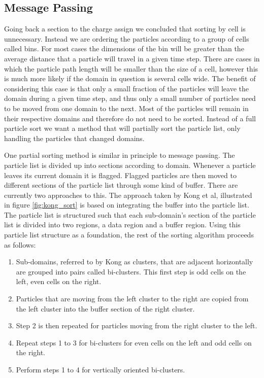 	\subsection{Message Passing}
	Going back a section to the charge assign we concluded that sorting by cell is unnecessary. Instead we are ordering the particles according to a group of cells called bins. For most cases the dimensions of the bin will be greater than the average distance that a particle will travel in a given time step. There are cases in which the particle path length will be smaller than the size of a cell, however this is much more likely if the domain in question is several cells wide. The benefit of considering this case is that only a small fraction of the particles will leave the domain during a given time step, and thus only a small number of particles need to be moved from one domain to the next. Most of the particles will remain in their respective domains and therefore do not need to be sorted. Instead of a full particle sort we want a method that will partially sort the particle list, only handling the particles that changed domains. 

	One partial sorting method is similar in principle to message passing. The particle list is divided up into sections according to domain. Whenever a particle leaves its current domain it is flagged. Flagged particles are then moved to different sections of the particle list through some kind of buffer. There are currently two approaches to this. The approach taken by Kong et al, illustrated in figure \ref{fig:kong_sort} is based on integrating the buffer into the particle list. The particle list is structured such that each sub-domain's section of the particle list is divided into two regions, a data region and a buffer region. Using this particle list structure as a foundation, the rest of the sorting algorithm proceeds as follows\cite{Kong2011}:

\begin{enumerate}
\singlespace
\item Sub-domains, referred to by Kong as clusters, that are adjacent horizontally are grouped into pairs called bi-clusters. This first step is odd cells on the left, even cells on the right. 
\item Particles that are moving from the left cluster to the right are copied from the left cluster into the buffer section of the right cluster. 
\item Step 2 is then repeated for particles moving from the right cluster to the left. 
\item Repeat steps 1 to 3 for bi-clusters for even cells on the left and odd cells on the right. 
\item Perform steps 1 to 4 for vertically oriented bi-clusters. 
\end{enumerate}


